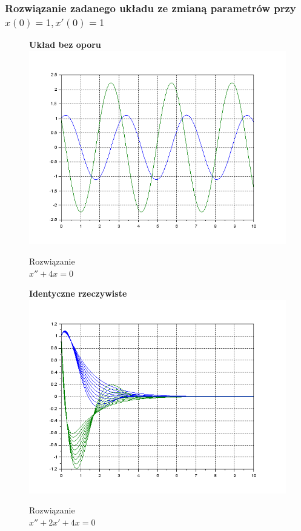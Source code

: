 \documentclass[12pt]{article}
\begin{document}
\subsubsection{Rozwiązanie zadanego układu ze zmianą parametrów przy $x(0)=1, x'(0)=1$}

\begin{figure}[H]
  \centering
  \hspace{-1.6cm}
  \begin{minipage}[b]{0.49\textwidth}
  \centering
   \hspace{1.6cm}
   \textbf{Układ bez oporu}
    \includegraphics[scale=0.47]{./img/5-boporu-xy-11}
    \caption{Rozwiązanie \\ \centering$x''+4x=0$}
  \end{minipage}
  \hfill
  \begin{minipage}[b]{0.49\textwidth}
  \centering
  \hspace{1.6cm}
   \textbf{Identyczne rzeczywiste}
    \includegraphics[scale=0.47]{./img/5-rowne-xy-11}
    \caption{Rozwiązanie \\ \centering $x''+2x'+4x=0$}
  \end{minipage}
\end{figure}
\end{document}
